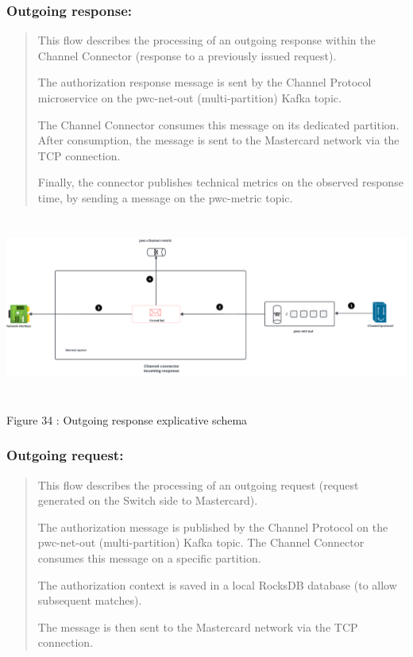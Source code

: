\documentclass[12pt,a4paper]{report}
\begin{document}
\hypertarget{outgoing-response}{%
\subsubsection{\texorpdfstring{\textbf{Outgoing
response:}}{Outgoing response:}}\label{outgoing-response}}

\begin{quote}
This flow describes the processing of an outgoing response within the
Channel Connector (response to a previously issued request).

The authorization response message is sent by the Channel Protocol
microservice on the pwc-net-out (multi-partition) Kafka topic.

The Channel Connector consumes this message on its dedicated partition.
After consumption, the message is sent to the Mastercard network via the
TCP connection.

Finally, the connector publishes technical metrics on the observed
response time, by sending a message on the pwc-metric topic.
\end{quote}

\includegraphics[width=6.84092in,height=2.37072in]{vertopal_d1b0b2209edd4c6aa8254f57daa0953b/media/image53.png}

\protect\hypertarget{_Toc201954510}{}{}Figure 34 : Outgoing response
explicative schema

\hypertarget{outgoing-request}{%
\subsubsection{\texorpdfstring{\textbf{Outgoing
request:}}{Outgoing request:}}\label{outgoing-request}}

\begin{quote}
This flow describes the processing of an outgoing request (request
generated on the Switch side to Mastercard).

The authorization message is published by the Channel Protocol on the
pwc-net-out (multi-partition) Kafka topic. The Channel Connector
consumes this message on a specific partition.

The authorization context is saved in a local RocksDB database (to allow
subsequent matches).

The message is then sent to the Mastercard network via the TCP
connection.
\end{quote}
\end{document}
